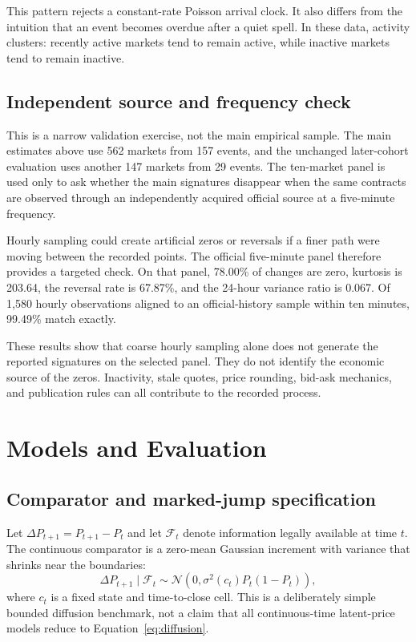 \documentclass[11pt]{article}
\begin{document}
This pattern rejects a constant-rate Poisson arrival clock. It also differs from the intuition
that an event becomes overdue after a quiet spell. In these data, activity clusters: recently
active markets tend to remain active, while inactive markets tend to remain inactive.

\subsection{Independent source and frequency check}

This is a narrow validation exercise, not the main empirical sample. The main estimates above use
562 markets from 157 events, and the unchanged later-cohort evaluation uses another 147 markets
from 29 events. The ten-market panel is used only to ask whether the main signatures disappear
when the same contracts are observed through an independently acquired official source at a
five-minute frequency.

Hourly sampling could create artificial zeros or reversals if a finer path were moving between
the recorded points. The official five-minute panel therefore provides a targeted check. On that panel,
78.00\% of changes are zero, kurtosis is 203.64, the reversal rate is 67.87\%, and the 24-hour
variance ratio is 0.067. Of 1,580 hourly observations aligned to an official-history sample within
ten minutes, 99.49\% match exactly.

These results show that coarse hourly sampling alone does not generate the reported signatures on
the selected panel. They do not identify the economic source of the zeros. Inactivity, stale
quotes, price rounding, bid-ask mechanics, and publication rules can all contribute to the
recorded process.

\section{Models and Evaluation}

\subsection{Comparator and marked-jump specification}

Let $\Delta P_{t+1}=P_{t+1}-P_t$ and let $\mathcal F_t$ denote information legally available at
time $t$. The continuous comparator is a zero-mean Gaussian increment with variance that shrinks
near the boundaries:
\begin{equation}
\Delta P_{t+1}\mid\mathcal F_t \sim
\mathcal N\!\left(0,\sigma^2(c_t)P_t(1-P_t)\right),
\label{eq:diffusion}
\end{equation}
where $c_t$ is a fixed state and time-to-close cell. This is a deliberately simple bounded
diffusion benchmark, not a claim that all continuous-time latent-price models reduce to
Equation~\eqref{eq:diffusion}.
\end{document}
